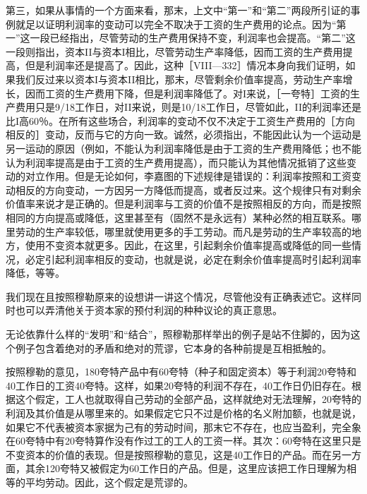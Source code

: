 第三，如果从事情的一个方面来看，那末，上文中“第一”和“第二”两段所引证的事例就足以证明利润率的变动可以完全不取决于工资的生产费用的论点。因为“第一”这一段已经指出，尽管劳动的生产费用保持不变，利润率也会提高。“第二”这一段则指出，资本II与资本I相比，尽管劳动生产率降低，因而工资的生产费用提高，但是利润率还是提高了。因此，这种［VIII—332］情况本身向我们证明，如果我们反过来以资本I与资本II相比，那末，尽管剩余价值率提高，劳动生产率增长，因而工资的生产费用下降，但是利润率降低了。对I来说，［一夸特］工资的生产费用只是9/18工作日，对II来说，则是10/18工作日，尽管如此，II的利润率还是比I高60％。在所有这些场合，利润率的变动不仅不决定于工资生产费用的［方向相反的］变动，反而与它的方向一致。诚然，必须指出，不能因此认为一个运动是另一运动的原因（例如，不能认为利润率降低是由于工资的生产费用降低；也不能认为利润率提高是由于工资的生产费用提高），而只能认为其他情况抵销了这些变动的对立作用。但是无论如何，李嘉图的下述规律是错误的：利润率按照和工资变动相反的方向变动，一方因另一方降低而提高，或者反过来。这个规律只有对剩余价值率来说才是正确的。但是利润率与工资的价值不是按照相反的方向，而是按照相同的方向提高或降低，这里甚至有（固然不是永远有）某种必然的相互联系。哪里劳动的生产率较低，哪里就使用更多的手工劳动。而凡是劳动的生产率较高的地方，使用不变资本就更多。因此，在这里，引起剩余价值率提高或降低的同一些情况，必定引起利润率相反的变动，也就是说，必定在剩余价值率提高时引起利润率降低，等等。


我们现在且按照穆勒原来的设想讲一讲这个情况，尽管他没有正确表述它。这样同时也可以弄清他关于资本家的预付利润的种种议论的真正意思。

无论依靠什么样的“发明”和“结合”，照穆勒那样举出的例子是站不住脚的，因为这个例子包含着绝对的矛盾和绝对的荒谬，它本身的各种前提是互相抵触的。

按照穆勒的意见，180夸特产品中有60夸特（种子和固定资本）等于利润20夸特和40工作日的工资40夸特。这样，如果20夸特的利润不存在，40工作日仍旧存在。根据这个假定，工人也就取得自己劳动的全部产品，这样就绝对无法理解，20夸特的利润及其价值是从哪里来的。如果假定它只不过是价格的名义附加额，也就是说，如果它不代表被资本家据为己有的劳动时间，那末它不存在，也应当盈利，完全象在60夸特中有20夸特算作没有作过工的工人的工资一样。其次：60夸特在这里只是不变资本的价值的表现。但是按照穆勒的意见，这是40工作日的产品。而在另一方面，其余120夸特又被假定为60工作日的产品。但是，这里应该把工作日理解为相等的平均劳动。因此，这个假定是荒谬的。

